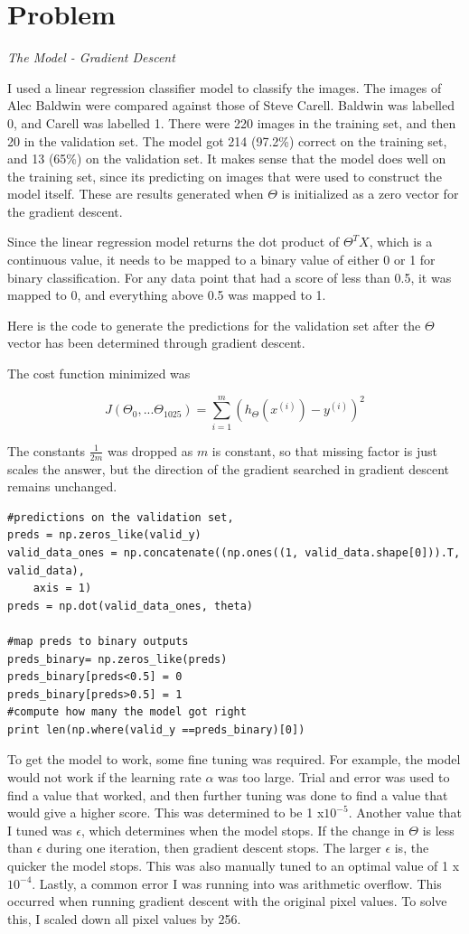 \documentclass{article}
\newcommand{\enterProblemHeader}[1]{
}
\newcommand{\exitProblemHeader}[1]{
}
\newcounter{homeworkProblemCounter} %
\newcommand{\homeworkProblemName}{}
\newenvironment{homeworkProblem}[1][Problem \arabic{homeworkProblemCounter}]{ %
\stepcounter{homeworkProblemCounter} %
\renewcommand{\homeworkProblemName}{#1} %
\section{\homeworkProblemName} %
\enterProblemHeader{\homeworkProblemName} %
}{
\exitProblemHeader{\homeworkProblemName} %
}
\begin{document}
\begin{homeworkProblem}
\noindent \textit{ The Model - Gradient Descent }

I used a linear regression classifier model to classify the images. The images of Alec Baldwin were compared against those of Steve Carell. Baldwin was labelled 0, and Carell was labelled 1. There were 220 images in the training set, and then 20 in the validation set. The model got 214 (97.2\%) correct on the training set, and 13 (65\%) on the validation set. It makes sense that the model does well on the training set, since its predicting on images that were used to construct the model itself. These are results generated when $\Theta$ is initialized as a zero vector for the gradient descent. 

Since the linear regression model returns the dot product of $\Theta^TX$, which is a continuous value, it needs to be mapped to a binary value of either 0 or 1 for binary classification. For any data point that had a score of less than 0.5, it was mapped to 0, and everything above 0.5 was mapped to 1. 


Here is the code to generate the predictions for the validation set after the $\Theta$ vector has been determined through gradient descent. 

The cost function minimized was 

\begin{equation}
J(\Theta_0 , ...\Theta_{1025}) = \sum_{i=1} ^m (h_{\Theta}(x^{(i)}) - y^{(i)}) ^2 
\label{eq:cost1}
\end{equation}


The constants $\frac{1}{2m}$ was dropped as $m$ is constant, so that missing factor is just scales the answer, but the direction of the gradient searched in gradient descent remains unchanged. 

\begin{lstlisting}
#predictions on the validation set, 
preds = np.zeros_like(valid_y)
valid_data_ones = np.concatenate((np.ones((1, valid_data.shape[0])).T, valid_data), 
	axis = 1)
preds = np.dot(valid_data_ones, theta)

#map preds to binary outputs
preds_binary= np.zeros_like(preds)
preds_binary[preds<0.5] = 0
preds_binary[preds>0.5] = 1
#compute how many the model got right
print len(np.where(valid_y ==preds_binary)[0])
\end{lstlisting}


To get the model to work, some fine tuning was required. For example, the model would not work if the learning rate $\alpha $ was too large. Trial and error was used to find a value that worked, and then further tuning was done to find a value that would give a higher score. This was determined to be 1 x$10 ^{-5}$. Another value that I tuned was $\epsilon$, which determines when the model stops. If the change in $\Theta$ is less than $\epsilon$ during one iteration, then gradient descent stops. The larger $\epsilon$ is, the quicker the model stops. This was also manually tuned to an optimal value of 1 x$10^{-4}$. Lastly, a common error I was running into was arithmetic overflow. This occurred when running gradient descent with the original pixel values. To solve this, I scaled down all pixel values by 256. 



\end{homeworkProblem}
\end{document}
